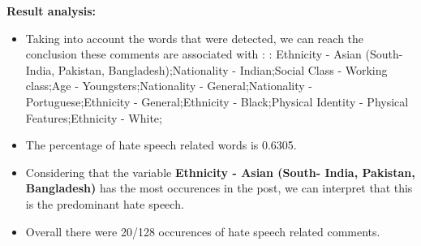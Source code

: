 \documentclass[11pt]{article}
\begin{document}
\textbf{\Large Result analysis:}

\begin{itemize}\item Taking into account the words that were detected, we can reach the conclusion these comments are associated with : : Ethnicity - Asian (South- India, Pakistan, Bangladesh);Nationality - Indian;Social Class - Working class;Age - Youngsters;Nationality - General;Nationality - Portuguese;Ethnicity - General;Ethnicity - Black;Physical Identity - Physical Features;Ethnicity - White;%

\item The percentage of hate speech related words is 0.6305.

\item Considering that the variable \textbf{Ethnicity - Asian (South- India, Pakistan, Bangladesh)} has the most occurences in the post, we can interpret that this is the predominant hate speech.

\item Overall there were 20/128 occurences of hate speech related comments.\end{itemize}
\end{document}
